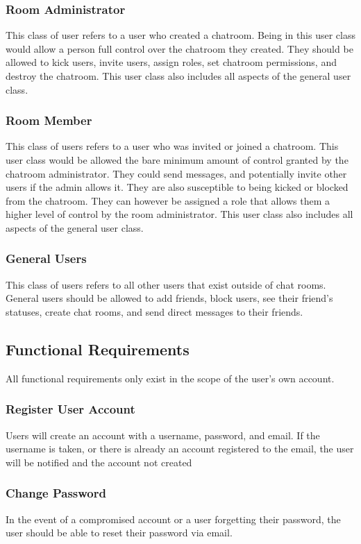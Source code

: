 \documentclass[11pt]{article}
\theoremstyle{plain}
\theoremstyle{definition}
\begin{document}
\subsubsection{Room Administrator}
This class of user refers to a user who created a chatroom. Being in this user class would allow a person full control over the chatroom they created. They should be allowed to kick users, invite users, assign roles, set chatroom permissions, and destroy the chatroom. This user class also includes all aspects of the general user class. 
\subsubsection{Room Member}
This class of users refers to a user who was invited or joined a chatroom. This user class would be allowed the bare minimum amount of control granted by the chatroom administrator. They could send messages, and potentially invite other users if the admin allows it. They are also susceptible to being kicked or blocked from the chatroom. They can however be assigned a role that allows them a higher level of control by the room administrator.  This user class also includes all aspects of the general user class. 
\subsubsection{General Users}
This class of users refers to all other users that exist outside of chat rooms. General users should be allowed to add friends, block users, see their friend's statuses, create chat rooms, and send direct messages to their friends.

\subsection{Functional Requirements}\label{sec:funcrequirements}
All functional requirements only exist in the scope of the user's own account.
\subsubsection{Register User Account}
Users will create an account with a username, password, and email. If the username is taken, or there is already an account registered to the email, the user will be notified and the account not created
\subsubsection{Change Password}
In the event of a compromised account or a user forgetting their password, the user should be able to reset their password via email.
\end{document}
